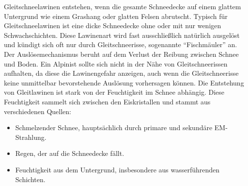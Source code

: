 


Gleitschneelawinen entstehen, wenn die gesamte Schneedecke auf einem glattem Untergrund wie einem Grashang oder glatten Felsen abrutscht. Typisch für Gleitschneelawinen ist eine dicke Schneedecke ohne oder mit nur wenigen Schwachschichten. Diese Lawinenart wird fast ausschließlich natürlich ausgelöst und kündigt sich oft nur durch Gleitschneerisse, sogenannte “Fischmäuler” an. Der Auslösemechanismus beruht auf dem Verlust der Reibung zwischen Schnee und Boden. Ein Alpinist sollte sich nicht in der Nähe von Gleitschneerissen aufhalten, da diese die Lawinengefahr anzeigen, auch wenn die Gleitschneerisse keine unmittelbar bevorstehende Auslösung vorhersagen können.
\newpage
Die Entstehung von Gleitlawinen ist stark von der Feuchtigkeit im Schnee abhängig. Diese Feuchtigkeit sammelt sich zwischen den Eiskristallen und stammt aus verschiedenen Quellen:

\begin{itemize}
    \item Schmelzender Schnee, hauptsächlich durch primare und sekundäre EM-Strahlung.
    \item Regen, der auf die Schneedecke fällt.
    \item Feuchtigkeit aus dem Untergrund, insbesondere aus wasserführenden Schichten.
\end{itemize}
